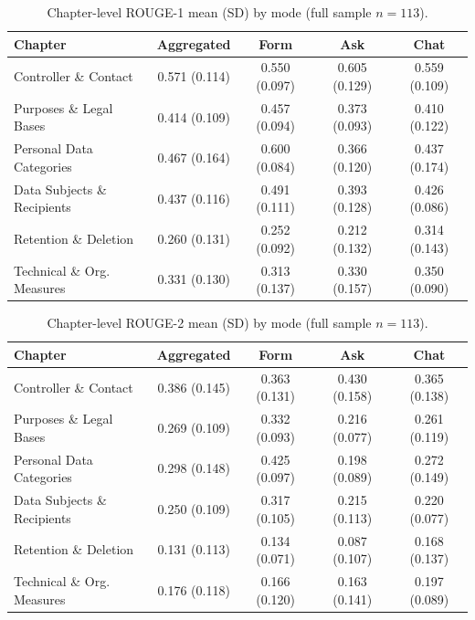\begin{table}[htbp]
\centering
\caption{Chapter-level ROUGE-1 mean (SD) by mode (full sample
$n = 113$).}
\label{tab:nlp-chapter-rouge1}
\small
\begin{tabular}{@{}l c c c c@{}}
\toprule
Chapter & Aggregated & Form & Ask & Chat \\
\midrule
Controller \& Contact         & 0.571 (0.114) & 0.550 (0.097) & 0.605 (0.129) & 0.559 (0.109) \\
Purposes \& Legal Bases       & 0.414 (0.109) & 0.457 (0.094) & 0.373 (0.093) & 0.410 (0.122) \\
Personal Data Categories      & 0.467 (0.164) & 0.600 (0.084) & 0.366 (0.120) & 0.437 (0.174) \\
Data Subjects \& Recipients   & 0.437 (0.116) & 0.491 (0.111) & 0.393 (0.128) & 0.426 (0.086) \\
Retention \& Deletion         & 0.260 (0.131) & 0.252 (0.092) & 0.212 (0.132) & 0.314 (0.143) \\
Technical \& Org. Measures    & 0.331 (0.130) & 0.313 (0.137) & 0.330 (0.157) & 0.350 (0.090) \\
\bottomrule
\end{tabular}
\end{table}

\begin{table}[htbp]
\centering
\caption{Chapter-level ROUGE-2 mean (SD) by mode (full sample
$n = 113$).}
\label{tab:nlp-chapter-rouge2}
\small
\begin{tabular}{@{}l c c c c@{}}
\toprule
Chapter & Aggregated & Form & Ask & Chat \\
\midrule
Controller \& Contact         & 0.386 (0.145) & 0.363 (0.131) & 0.430 (0.158) & 0.365 (0.138) \\
Purposes \& Legal Bases       & 0.269 (0.109) & 0.332 (0.093) & 0.216 (0.077) & 0.261 (0.119) \\
Personal Data Categories      & 0.298 (0.148) & 0.425 (0.097) & 0.198 (0.089) & 0.272 (0.149) \\
Data Subjects \& Recipients   & 0.250 (0.109) & 0.317 (0.105) & 0.215 (0.113) & 0.220 (0.077) \\
Retention \& Deletion         & 0.131 (0.113) & 0.134 (0.071) & 0.087 (0.107) & 0.168 (0.137) \\
Technical \& Org. Measures    & 0.176 (0.118) & 0.166 (0.120) & 0.163 (0.141) & 0.197 (0.089) \\
\bottomrule
\end{tabular}
\end{table}


